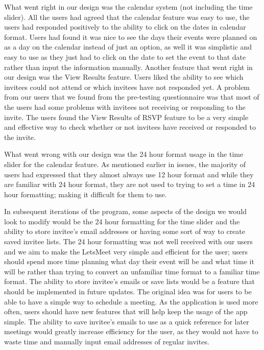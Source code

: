 \documentclass{sigchi}
\begin{document}
What went right in our design was the calendar system (not including the time slider). All the users had agreed that the calendar feature was easy to use, the users had responded positively to the ability to click on the dates in calendar format. Users had found it was nice to see the days their events were planned on as a day on the calendar instead of just an option, as well it was simplistic and easy to use as they just had to click on the date to set the event to that date rather than input the information manually. Another feature that went right in our design was the View Results feature. Users liked the ability to see which invitees could not attend or which invitees have not responded yet. A problem from our users that we found from the pre-testing questionnaire was that most of the users had some problems with invitees not receiving or responding to the invite. The users found the View Results of RSVP feature to be a very simple and effective way to check whether or not invitees have received or responded to the invite.

What went wrong with our design was the 24 hour format usage in the time slider for the calendar feature. As mentioned earlier in issues, the majority of users had expressed that they almost always use 12 hour format and while they are familiar with 24 hour format, they are not used to trying to set a time in 24 hour formatting; making it difficult for them to use.

In subsequent iterations of the program, some aspects of the design we would look to modify would be the 24 hour formatting for the time slider and the ability to store invitee's email addresses or having some sort of way to create saved invitee lists. The 24 hour formatting was not well received with our users and we aim to make the LetsMeet very simple and efficient for the user; users should spend more time planning what day their event will be and what time it will be rather than trying to convert an unfamiliar time format to a familiar time format. The ability to store invitee's emails or save lists would be a feature that should be implemented in future updates. The original idea was for users to be able to have a simple way to schedule a meeting. As the application is used more often, users should have new features that will help keep the usage of the app simple. The ability to save invitee's emails to use as a quick reference for later meetings would greatly increase efficiency for the user, as they would not have to waste time and manually input email addresses of regular invites.
\end{document}
